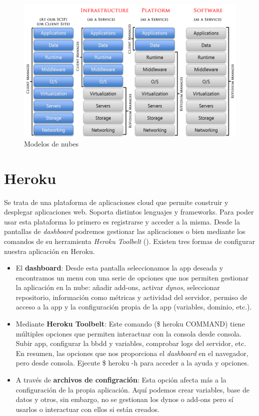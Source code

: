 \begin{figure}[H]
	\centering
	\includegraphics[width=12cm]{./images/cloud-models.png}
	\caption{Modelos de nubes} \label{fig:cloud-models}
\end{figure}

\vspace*{0.2in}
\section{Heroku}\label{cap.3.2}

Se trata de una plataforma de aplicaciones cloud que permite construir y desplegar aplicaciones web. Soporta distintos lenguajes y frameworks. Para poder usar esta plataforma lo primero es registrarse y acceder a la misma. Desde la pantallas de \emph{dashboard} podremos gestionar las aplicaciones o bien mediante los comandos de su herramienta \emph{Heroku Toolbelt} (\cite{URL:HerokuToolbelt}). Existen tres formas de configurar nuestra aplicación en Heroku.
\begin{itemize}
	\item El \textbf{dashboard}: Desde esta pantalla seleccionamos la app deseada y encontramos un menu con una serie de opciones que nos permiten gestionar la aplicación en la nube: añadir add-ons, activar \emph{dynos}, seleccionar repositorio, información como métricas y actividad del servidor, permiso de acceso a la app y la configuración propia de la app (variables, dominio, etc.).
	\item Mediante \textbf{Heroku Toolbelt}: Este comando (\$ heroku COMMAND) tiene múltiples opciones que permiten interactuar con la consola desde consola. Subir app, configurar la bbdd y variables, comprobar logs del servidor, etc. En resumen, las opciones que nos proporciona el \emph{dashboard} en el navegador, pero desde consola. Ejecute \$ heroku -h para acceder a la ayuda y opciones.
	\item A través de \textbf{archivos de configración}: Esta opción afecta más a la configuración de la propia aplicación. Aquí podemos crear variables, base de datos y otros, sin embargo, no se gestionan los dynos o add-ons pero sí usarlos o interactuar con ellos si están creados.
\end{itemize}

